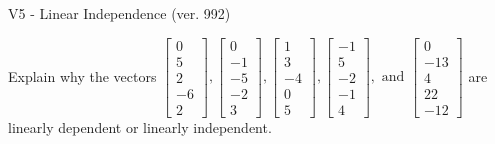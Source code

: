 \begin{exercise}
  \begin{exerciseTitle}V5 - Linear Independence (ver. 992)\end{exerciseTitle}
  \begin{exerciseStatement}
    Explain why the vectors \(\left[\begin{array}{r}
0 \\
5 \\
2 \\
-6 \\
2
\end{array}\right] , \left[\begin{array}{r}
0 \\
-1 \\
-5 \\
-2 \\
3
\end{array}\right] , \left[\begin{array}{r}
1 \\
3 \\
-4 \\
0 \\
5
\end{array}\right] , \left[\begin{array}{r}
-1 \\
5 \\
-2 \\
-1 \\
4
\end{array}\right] , \text{ and } \left[\begin{array}{r}
0 \\
-13 \\
4 \\
22 \\
-12
\end{array}\right]\) are linearly dependent or linearly independent.	



\end{exerciseStatement}
\end{exercise}
